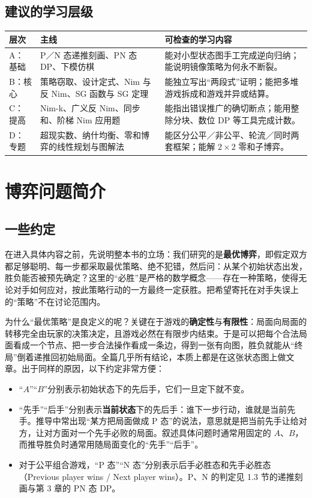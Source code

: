 \documentclass[UTF8,a4paper,11pt,oneside,openany,fontset=fandol]{ctexbook}
\theoremstyle{definition}
\begin{document}
\section*{建议的学习层级}
\begin{longtable}{p{}p{}p{}}
\toprule
层次 & 主线 & 可检查的学习内容\\\midrule
A：基础 & P／N 态递推刻画、PN 态 DP、下模仿棋 & 能对小型状态图手工完成逆向归纳；能说明镜像策略为何永不断裂。\\
B：核心 & 策略窃取、设计定式、Nim 与反 Nim、SG 函数与 SG 定理 & 能独立写出“两段式”证明；能把多堆游戏拆成和游戏并异或结算。\\
C：提高 & Nim-k、广义反 Nim、同步和、阶梯 Nim 应用题 & 能指出错误推广的确切断点；能用整除分块、数位 DP 等工具完成计数。\\
D：专题 & 超现实数、纳什均衡、零和博弈的线性规划与图解法 & 能区分公平／非公平、轮流／同时两套框架；能解 $2\times2$ 零和子博弈。\\
\bottomrule
\end{longtable}

\tableofcontents
\mainmatter

\chapter{博弈问题简介}
\section{一些约定}
在进入具体内容之前，先说明整本书的立场：我们研究的是\textbf{最优博弈}，即假定双方都足够聪明、每一步都采取最优策略、绝不犯错，然后问：从某个初始状态出发，胜负能否被预先确定？这里的“必胜”是严格的数学概念——存在一种策略，使得无论对手如何应对，按此策略行动的一方最终一定获胜。把希望寄托在对手失误上的“策略”不在讨论范围内。

为什么“最优策略”是良定义的呢？关键在于游戏的\textbf{确定性}与\textbf{有限性}：局面向局面的转移完全由玩家的决策决定，且游戏必然在有限步内结束。于是可以把每个合法局面看成一个节点、把一步合法操作看成一条边，得到一张有向图，胜负就能从“终局”倒着递推回初始局面。全篇几乎所有结论，本质上都是在这张状态图上做文章。出于同样的原因，以下约定非常方便：
\begin{itemize}
\item “$A$”“$B$”分别表示初始状态下的先后手，它们一旦定下就不变。
\item “先手”“后手”分别表示\textbf{当前状态}下的先后手：谁下一步行动，谁就是当前先手。推导中常出现“某方把局面做成 P 态”的说法，意思就是把当前先手让给对方，让对方面对一个先手必败的局面。叙述具体问题时通常用固定的 $A$、$B$，而推导胜负时通常用随局面变化的“先手”“后手”。
\item 对于公平组合游戏，“P 态”“N 态”分别表示后手必胜态和先手必胜态（Previous player wins / Next player wins）。P、N 的判定见 1.3 节的递推刻画与第 3 章的 PN 态 DP。
\end{itemize}
\end{document}
